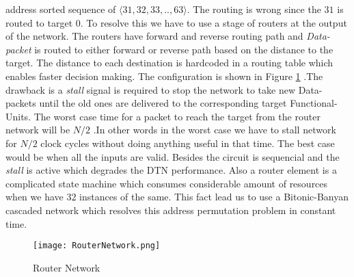 					      address sorted sequence of $\langle31,32,33,..,63\rangle$. The routing is wrong since the $31$ is routed to target $0$. To resolve this we have to use a stage of routers at the output of the network. 
					      The routers have forward and reverse routing path and \textit{Data-packet} is routed to either forward or reverse path based on the distance to the target. The distance to each destination is hardcoded 
					      in a routing table which enables faster decision making. The configuration is shown in Figure \ref{fig:RouterNetwork} .The drawback is a \textit{stall} signal is required
					      to stop the network to take new Data-packets until the old ones are delivered to the corresponding target Functional-Units. The worst case time for a packet to reach the target
					      from the router network will be $N / 2$ .In other words in the worst case we have to stall network for $N/2$ clock cycles without doing anything useful in that time. The best
					      case would be when all the inputs are valid. Besides the circuit is sequencial and the \textit{stall} is active which degrades the DTN performance. 
					      Also a router element is a complicated state machine which consumes considerable amount of resources when we have $32$ instances of the same. This fact 
					      lead us to use a Bitonic-Banyan\cite{batcher_banyan_ref} cascaded network which resolves this address permutation problem in constant time.
					      \begin{figure}[!ht]
							\texttt{[image: RouterNetwork.png]}
						      \caption{Router Network}
					      \label{fig:RouterNetwork}
					      \end{figure}
